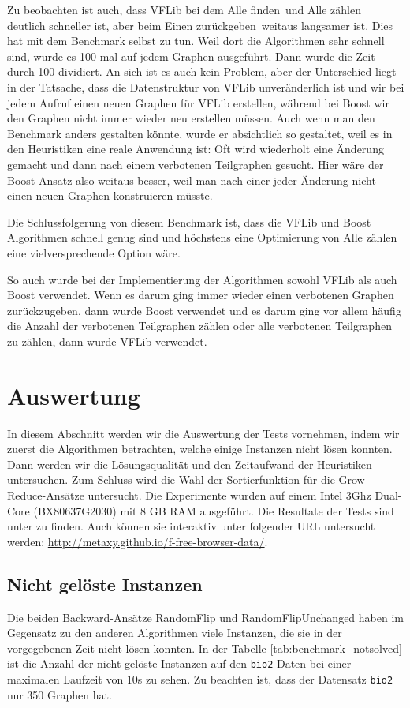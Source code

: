 \documentclass[12pt,a4paper,onecolumn,oneside,titlepage]{article}
\newcommand{\vars}{\texttt}
\begin{document}
Zu beobachten ist auch, dass VFLib bei dem \glqq Alle finden\grqq \, und \glqq Alle zählen\grqq \, deutlich schneller ist, aber beim \glqq Einen zurückgeben\grqq \, weitaus langsamer ist. Dies hat mit dem Benchmark selbst zu tun. Weil dort die Algorithmen sehr schnell sind, wurde es 100-mal auf jedem Graphen ausgeführt. Dann wurde die Zeit durch 100 dividiert. 
An sich ist es auch kein Problem, aber der Unterschied liegt in der Tatsache, dass die Datenstruktur von VFLib unveränderlich ist und wir bei jedem Aufruf einen neuen Graphen für VFLib erstellen, während bei Boost wir den Graphen nicht immer wieder neu erstellen müssen. Auch wenn man den Benchmark anders gestalten könnte, wurde er absichtlich so gestaltet, weil es in den Heuristiken eine reale Anwendung ist: Oft wird wiederholt eine Änderung gemacht und dann nach einem verbotenen Teilgraphen gesucht. Hier wäre der Boost-Ansatz also weitaus besser, weil man nach einer jeder Änderung nicht einen neuen Graphen konstruieren müsste.

Die Schlussfolgerung von diesem Benchmark ist, dass die VFLib und Boost Algorithmen schnell genug sind und höchstens eine Optimierung von \glqq   Alle zählen\grqq \, eine vielversprechende Option wäre.

So auch wurde bei der Implementierung der Algorithmen sowohl VFLib als auch Boost verwendet. Wenn es darum ging immer wieder einen verbotenen Graphen zurückzugeben, dann wurde Boost verwendet und es darum ging vor allem häufig die Anzahl der verbotenen Teilgraphen zählen oder alle verbotenen Teilgraphen zu zählen, dann wurde VFLib verwendet.
\newpage
\section{Auswertung}
\label{sec:results}

In diesem Abschnitt werden wir die Auswertung der Tests vornehmen, indem wir zuerst die Algorithmen betrachten, welche einige Instanzen nicht lösen konnten. Dann werden wir die Lösungsqualität und den Zeitaufwand der Heuristiken untersuchen. Zum Schluss wird die Wahl der Sortierfunktion für die Grow-Reduce-Ansätze untersucht. Die Experimente wurden auf einem Intel 3Ghz Dual-Core (BX80637G2030) mit 8 GB RAM ausgeführt.
Die Resultate der Tests sind unter \cite{Benchmark} zu finden. Auch können sie interaktiv unter folgender URL untersucht werden: \url{http://metaxy.github.io/f-free-browser-data/}.

\subsection{Nicht gelöste Instanzen}
Die beiden Backward-Ansätze RandomFlip und RandomFlipUnchanged haben im Gegensatz zu den anderen Algorithmen viele Instanzen, die sie in der vorgegebenen Zeit nicht lösen konnten. In der Tabelle \ref{tab:benchmark_notsolved} ist die Anzahl der nicht gelöste Instanzen auf den \vars{bio2} Daten bei einer maximalen Laufzeit von 10s zu sehen. Zu beachten ist, dass der Datensatz \vars{bio2} nur 350 Graphen hat. 
\end{document}
